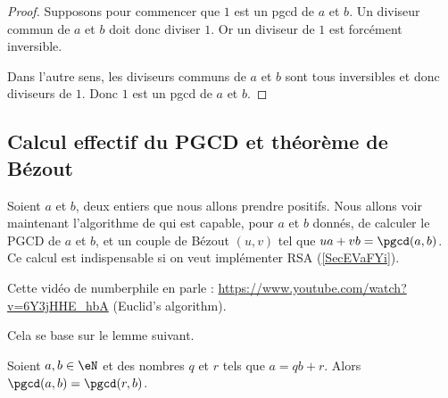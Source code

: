 \begin{proof}
	Supposons pour commencer que \( 1\) est un pgcd de \( a\) et \( b\). Un diviseur commun de \( a\) et \( b\) doit donc diviser \( 1\). Or un diviseur de \( 1\) est forcément inversible.

	Dans l'autre sens, les diviseurs communs de \( a\) et \( b\) sont tous inversibles et donc diviseurs de \( 1\). Donc \( 1\) est un pgcd de \( a\) et \( b\).
\end{proof}

\subsection{Calcul effectif du PGCD et théorème de Bézout}
\label{subSecIpmnhO}

Soient \( a\) et \( b\), deux entiers que nous allons prendre positifs. Nous allons voir maintenant l'algorithme de  qui est capable, pour \( a\) et \( b\) donnés, de calculer le PGCD de \( a\) et \( b\), et un couple de Bézout \( (u,v)\) tel que \( ua+vb=\pgcd(a,b)\). Ce calcul est indispensable si on veut implémenter RSA (\ref{SecEVaFYi}).

\begin{normaltext}
	Cette vidéo de numberphile en parle : \url{https://www.youtube.com/watch?v=6Y3jHHE_hbA} (Euclid's algorithm).
\end{normaltext}

Cela se base sur le lemme suivant.

\begin{lemma}       \label{LemiVqita}
	Soient \( a,b\in \eN\) et des nombres \( q\) et \( r\) tels que \( a=qb+r\). Alors \( \pgcd(a,b)=\pgcd(r,b)\).
\end{lemma}


